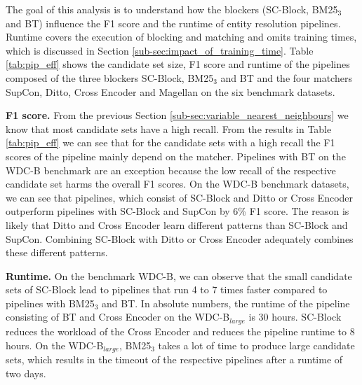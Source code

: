 \documentclass[sigconf,nonacm]{acmart}
\begin{document}
The goal of this analysis is to understand how the blockers (SC-Block, BM25$_3$ and BT) influence the F1 score and the runtime of entity resolution pipelines.
Runtime covers the execution of blocking and matching and omits training times,
which is discussed in Section \ref{sub-sec:impact_of_training_time}.
Table \ref{tab:pip_eff} shows the candidate set size, F1 score and runtime of the pipelines composed of the three blockers SC-Block, BM25$_3$ and BT and the four matchers SupCon, Ditto, Cross Encoder and Magellan on the six benchmark datasets.


\vspace{.1cm}\noindent\textbf{F1 score.}
From the previous Section \ref{sub-sec:variable_nearest_neighbours} we know that most candidate sets have a high recall. From the results in Table \ref{tab:pip_eff} we can see that for the candidate sets with a high recall the F1 scores of the pipeline mainly depend on the matcher. Pipelines with BT on the WDC-B benchmark are an exception because the low recall of the respective candidate set harms the overall F1 scores. On the WDC-B benchmark datasets, we can see that pipelines, which consist of SC-Block and Ditto or Cross Encoder outperform pipelines with SC-Block and SupCon by 6\% F1 score. The reason is likely that Ditto and Cross Encoder learn different patterns than SC-Block and SupCon. Combining SC-Block with Ditto or Cross Encoder adequately combines these different patterns.

\vspace{.1cm}\noindent\textbf{Runtime.}
On the benchmark WDC-B, we can observe that the small candidate sets of SC-Block lead to pipelines that run 4 to 7 times faster compared to pipelines with BM25$_3$ and BT.
In absolute numbers, the runtime of the pipeline consisting of BT and Cross Encoder on the WDC-B$_{large}$ is 30 hours. SC-Block reduces the workload of the Cross Encoder and reduces the pipeline runtime to 8 hours.
On the WDC-B$_{large}$, BM25$_3$ takes a lot of time to produce large candidate sets, which results in the timeout of the respective pipelines after a runtime of two days.
\end{document}
